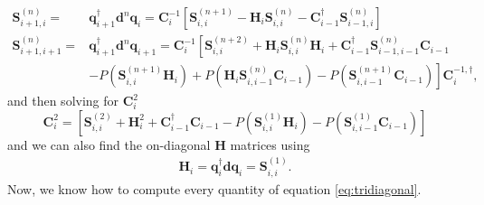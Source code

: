 \documentclass[12pt]{article} %
\begin{document}
\begin{equation}
\end{equation}
\begin{equation}
\begin{aligned}
\mathbf{S}_{i+1, i}^{(n)}=&\mathbf{q}_{i+1}^{\dagger} \mathbf{d}^n \mathbf{q}_i=\mathbf{C}_i^{-1}\left[\mathbf{S}_{i, i}^{(n+1)}-\mathbf{H}_i \mathbf{S}_{i, i}^{(n)}-\mathbf{C}_{i-1}^{\dagger} \mathbf{S}_{i-1, i}^{(n)}\right]\\
\mathbf{S}_{i+1, i+1}^{(n)}= & \mathbf{q}_{i+1}^{\dagger} \mathbf{d}^n \mathbf{q}_{i+1}
=  \mathbf{C}_i^{-1}\left[\mathbf{S}_{i, i}^{(n+2)}+\mathbf{H}_i \mathbf{S}_{i, i}^{(n)} \mathbf{H}_i+\mathbf{C}_{i-1}^{\dagger} \mathbf{S}_{i-1, i-1}^{(n)} \mathbf{C}_{i-1}\right. \\
& \left.-P\left(\mathbf{S}_{i, i}^{(n+1)} \mathbf{H}_i\right)+P\left(\mathbf{H}_i \mathbf{S}_{i, i-1}^{(n)} \mathbf{C}_{i-1}\right)-P\left(\mathbf{S}_{i, i-1}^{(n+1)} \mathbf{C}_{i-1}\right)\right] \mathbf{C}_i^{-1, \dagger},
\end{aligned}
\end{equation}
and then solving for $\mathbf{C}_i^2$
\begin{equation}
    \mathbf{C}_i^2=\left[\mathbf{S}_{i, i}^{(2)}+\mathbf{H}_i^2+\mathbf{C}_{i-1}^{\dagger} \mathbf{C}_{i-1}-P\left(\mathbf{S}_{i, i}^{(1)} \mathbf{H}_i\right)-P\left(\mathbf{S}_{i, i-1}^{(1)} \mathbf{C}_{i-1}\right)\right]
\end{equation}
and we can also find the on-diagonal $\mathbf{H}$ matrices using
\begin{equation}
\begin{aligned}
\mathbf{H}_i=\mathbf{q}_i^{\dagger} \mathbf{d} \mathbf{q}_i=\mathbf{S}_{i, i}^{(1)} .
\end{aligned}
\end{equation}
Now, we know how to compute every quantity of equation \ref{eq:tridiagonal}.




\end{document}

